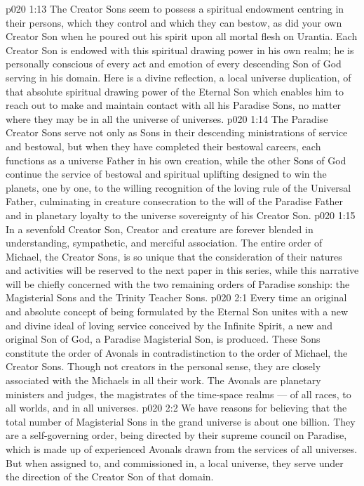 \vs p020 1:13 The Creator Sons seem to possess a spiritual endowment centring in their persons, which they control and which they can bestow, as did your own Creator Son when he poured out his spirit upon all mortal flesh on Urantia. Each Creator Son is endowed with this spiritual drawing power in his own realm; he is personally conscious of every act and emotion of every descending Son of God serving in his domain. Here is a divine reflection, a local universe duplication, of that absolute spiritual drawing power of the Eternal Son which enables him to reach out to make and maintain contact with all his Paradise Sons, no matter where they may be in all the universe of universes.
\vs p020 1:14 The Paradise Creator Sons serve not only as Sons in their descending ministrations of service and bestowal, but when they have completed their bestowal careers, each functions as a universe Father in his own creation, while the other Sons of God continue the service of bestowal and spiritual uplifting designed to win the planets, one by one, to the willing recognition of the loving rule of the Universal Father, culminating in creature consecration to the will of the Paradise Father and in planetary loyalty to the universe sovereignty of his Creator Son.
\vs p020 1:15 In a sevenfold Creator Son, Creator and creature are forever blended in understanding, sympathetic, and merciful association. The entire order of Michael, the Creator Sons, is so unique that the consideration of their natures and activities will be reserved to the next paper in this series, while this narrative will be chiefly concerned with the two remaining orders of Paradise sonship: the Magisterial Sons and the Trinity Teacher Sons.
\vs p020 2:1 Every time an original and absolute concept of being formulated by the Eternal Son unites with a new and divine ideal of loving service conceived by the Infinite Spirit, a new and original Son of God, a Paradise Magisterial Son, is produced. These Sons constitute the order of Avonals in contradistinction to the order of Michael, the Creator Sons. Though not creators in the personal sense, they are closely associated with the Michaels in all their work. The Avonals are planetary ministers and judges, the magistrates of the time\hyp{}space realms --- of all races, to all worlds, and in all universes.
\vs p020 2:2 We have reasons for believing that the total number of Magisterial Sons in the grand universe is about one billion. They are a self\hyp{}governing order, being directed by their supreme council on Paradise, which is made up of experienced Avonals drawn from the services of all universes. But when assigned to, and commissioned in, a local universe, they serve under the direction of the Creator Son of that domain.
